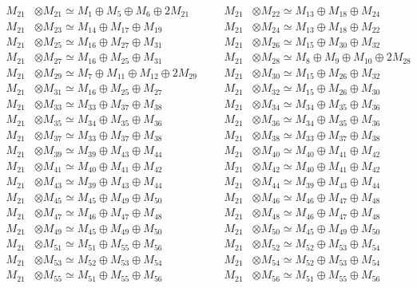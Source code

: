 \begin{align*}
M_{21} &\otimes M_{21} \simeq M_{1} \oplus M_{5} \oplus M_{6} \oplus 2M_{21} &&& M_{21} &\otimes M_{22} \simeq M_{13} \oplus M_{18} \oplus M_{24}\\
M_{21} &\otimes M_{23} \simeq M_{14} \oplus M_{17} \oplus M_{19} &&& M_{21} &\otimes M_{24} \simeq M_{13} \oplus M_{18} \oplus M_{22}\\
M_{21} &\otimes M_{25} \simeq M_{16} \oplus M_{27} \oplus M_{31} &&& M_{21} &\otimes M_{26} \simeq M_{15} \oplus M_{30} \oplus M_{32}\\
M_{21} &\otimes M_{27} \simeq M_{16} \oplus M_{25} \oplus M_{31} &&& M_{21} &\otimes M_{28} \simeq M_{8} \oplus M_{9} \oplus M_{10} \oplus 2M_{28}\\
M_{21} &\otimes M_{29} \simeq M_{7} \oplus M_{11} \oplus M_{12} \oplus 2M_{29} &&& M_{21} &\otimes M_{30} \simeq M_{15} \oplus M_{26} \oplus M_{32}\\
M_{21} &\otimes M_{31} \simeq M_{16} \oplus M_{25} \oplus M_{27} &&& M_{21} &\otimes M_{32} \simeq M_{15} \oplus M_{26} \oplus M_{30}\\
M_{21} &\otimes M_{33} \simeq M_{33} \oplus M_{37} \oplus M_{38} &&& M_{21} &\otimes M_{34} \simeq M_{34} \oplus M_{35} \oplus M_{36}\\
M_{21} &\otimes M_{35} \simeq M_{34} \oplus M_{35} \oplus M_{36} &&& M_{21} &\otimes M_{36} \simeq M_{34} \oplus M_{35} \oplus M_{36}\\
M_{21} &\otimes M_{37} \simeq M_{33} \oplus M_{37} \oplus M_{38} &&& M_{21} &\otimes M_{38} \simeq M_{33} \oplus M_{37} \oplus M_{38}\\
M_{21} &\otimes M_{39} \simeq M_{39} \oplus M_{43} \oplus M_{44} &&& M_{21} &\otimes M_{40} \simeq M_{40} \oplus M_{41} \oplus M_{42}\\
M_{21} &\otimes M_{41} \simeq M_{40} \oplus M_{41} \oplus M_{42} &&& M_{21} &\otimes M_{42} \simeq M_{40} \oplus M_{41} \oplus M_{42}\\
M_{21} &\otimes M_{43} \simeq M_{39} \oplus M_{43} \oplus M_{44} &&& M_{21} &\otimes M_{44} \simeq M_{39} \oplus M_{43} \oplus M_{44}\\
M_{21} &\otimes M_{45} \simeq M_{45} \oplus M_{49} \oplus M_{50} &&& M_{21} &\otimes M_{46} \simeq M_{46} \oplus M_{47} \oplus M_{48}\\
M_{21} &\otimes M_{47} \simeq M_{46} \oplus M_{47} \oplus M_{48} &&& M_{21} &\otimes M_{48} \simeq M_{46} \oplus M_{47} \oplus M_{48}\\
M_{21} &\otimes M_{49} \simeq M_{45} \oplus M_{49} \oplus M_{50} &&& M_{21} &\otimes M_{50} \simeq M_{45} \oplus M_{49} \oplus M_{50}\\
M_{21} &\otimes M_{51} \simeq M_{51} \oplus M_{55} \oplus M_{56} &&& M_{21} &\otimes M_{52} \simeq M_{52} \oplus M_{53} \oplus M_{54}\\
M_{21} &\otimes M_{53} \simeq M_{52} \oplus M_{53} \oplus M_{54} &&& M_{21} &\otimes M_{54} \simeq M_{52} \oplus M_{53} \oplus M_{54}\\
M_{21} &\otimes M_{55} \simeq M_{51} \oplus M_{55} \oplus M_{56} &&& M_{21} &\otimes M_{56} \simeq M_{51} \oplus M_{55} \oplus M_{56}\\
\end{align*}

